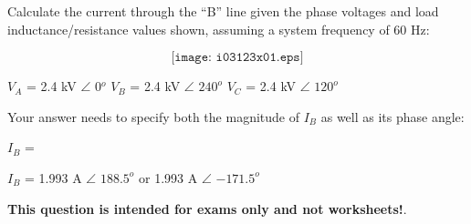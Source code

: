 

Calculate the current through the ``B'' line given the phase voltages and load inductance/resistance values shown, assuming a system frequency of 60 Hz:

$$\texttt{[image: i03123x01.eps]}$$

$V_A$ = 2.4 kV $\angle$ 0$^{o}$ \hskip 20pt $V_B$ = 2.4 kV $\angle$ $240^{o}$ \hskip 20pt $V_C$ = 2.4 kV $\angle$ $120^{o}$

\vskip 10pt

Your answer needs to specify both the magnitude of $I_B$ as well as its phase angle:

\vskip 10pt

$I_B$ = \underbar{\hskip 80pt} 







$I_B$ = 1.993 A $\angle$ $188.5^o$ \hskip 10pt or \hskip 10pt 1.993 A $\angle$ $-171.5^o$  
 






{\bf This question is intended for exams only and not worksheets!}.



